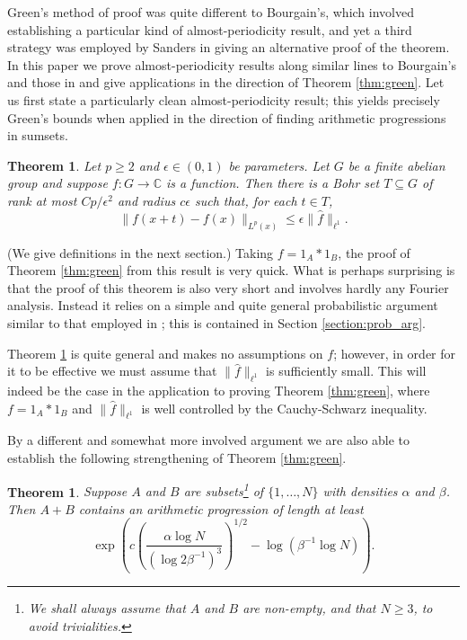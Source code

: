 \documentclass[12pt,a4paper,reqno]{amsart}
\numberwithin{equation}{section}
\theoremstyle{plain}
\newtheorem{theorem}[subsection]{Theorem}
\theoremstyle{definition}
\renewcommand{\leq}{\leqslant}
\renewcommand{\geq}{\geqslant}
\renewcommand{\subset}{\subseteq}
\def\C{\mathbb{C}}
\def\fhat{\widehat{f}}
\providecommand{\norm}[1]{\lVert #1 \rVert}
\theoremstyle{plain}
\begin{document}
Green's method of proof was quite different to Bourgain's, which involved establishing a particular kind of almost-periodicity result, and yet a third strategy was employed by Sanders \cite{sanders:longAPs} in giving an alternative proof of the theorem. In this paper we prove almost-periodicity results along similar lines to Bourgain's and those in \cite{croot-sisask} and give applications in the direction of Theorem \ref{thm:green}. Let us first state a particularly clean almost-periodicity result; this yields precisely Green's bounds when applied in the direction of finding arithmetic progressions in sumsets.

\begin{theorem}\label{thm:fourier_lp}
Let $p \geq 2$ and $\epsilon \in (0,1)$ be parameters. Let $G$ be a finite abelian group and suppose $f : G \to \C$ is a function. Then there is a Bohr set $T \subset G$ of rank at most $Cp/\epsilon^2$ and radius $c\epsilon$ such that, for each $t \in T$,
\[ \norm{ f(x+t) - f(x) }_{L^p(x)} \leq \epsilon \norm{\fhat}_{\ell^1}. \]
\end{theorem}

(We give definitions in the next section.) Taking $f = 1_A*1_B$, the proof of Theorem \ref{thm:green} from this result is very quick. What is perhaps surprising is that the proof of this theorem is also very short and involves hardly any Fourier analysis. Instead it relies on a simple and quite general probabilistic argument similar to that employed in \cite{croot-sisask}; this is contained in Section \ref{section:prob_arg}.

Theorem \ref{thm:fourier_lp} is quite general and makes no assumptions on $f$; however, in order for it to be effective we must assume that $\norm{\fhat}_{\ell^1}$ is sufficiently small.  This will indeed be the case in the application to proving Theorem \ref{thm:green}, where $f = 1_A*1_B$ and $\norm{\fhat}_{\ell^1}$ is well controlled by the Cauchy-Schwarz inequality.

By a different and somewhat more involved argument we are also able to establish the following strengthening of Theorem \ref{thm:green}.

\begin{theorem}\label{thm:impAPs}
Suppose $A$ and $B$ are subsets\footnote{We shall always assume that $A$ and $B$ are non-empty, and that $N \geq 3$, to avoid trivialities.} of $\{1,\ldots,N\}$ with densities $\alpha$ and $\beta$. Then $A+B$ contains an arithmetic progression of length at least
\[ \exp\left( c \left(\frac{\alpha \log N}{(\log 2\beta^{-1})^3} \right)^{1/2} - \log( \beta^{-1} \log N) \right). \]
\end{theorem}
\end{document}
